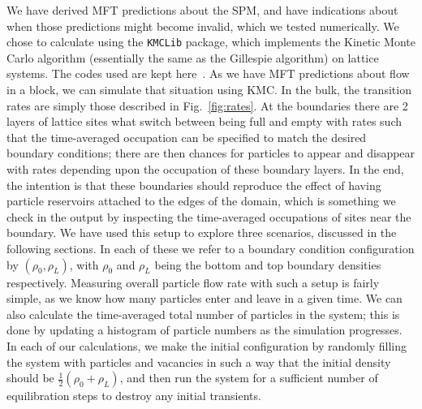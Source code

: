 \documentclass[
reprint,
 amsmath,amssymb,
 aps,
 prl,
]{revtex4-1}
\begin{document}
We have derived MFT predictions about the SPM, and have indications about when those predictions might become invalid, which we tested numerically.
We chose to calculate using the \texttt{KMCLib}\cite{leetmaa2014kmclib} package, which implements the Kinetic Monte Carlo algorithm
(essentially the same as the Gillespie algorithm\cite{Gillespie1977})
on lattice systems. The codes used are kept here~\cite{jHellGitRepo}.
As we have MFT predictions about flow in a block, we can simulate that situation using KMC. In the bulk, the transition rates are simply those described in Fig.~\ref{fig:rates}. At the boundaries
there are 2 layers of lattice sites what switch between being full and empty with rates such that the time-averaged occupation can be specified to match the desired boundary conditions; there are then chances for particles to appear
and disappear with rates depending upon the occupation of these boundary layers. In the end, the intention is that these boundaries should reproduce the effect of having particle reservoirs attached to the edges of the domain,
which is something we check
in the output by inspecting the time-averaged occupations of sites near the boundary. We have used this setup to explore three scenarios, discussed in the following sections. In each of these we refer to a boundary condition configuration
by $(\rho_0, \rho_L)$, with $\rho_0$ and $\rho_L$ being the bottom and top boundary densities respectively.
Measuring overall particle flow rate with such a setup is fairly simple, as we know how many particles enter and leave in a given time.
We can also calculate the time-averaged total number of particles in the system; this is done by updating a histogram of particle numbers
as the simulation progresses. In each of our calculations, we make the initial configuration by randomly filling the system with particles and vacancies in such a way that the initial density should be $\frac{1}{2}(\rho_0 + \rho_L)$, and then
run the system for a sufficient number of equilibration steps to destroy any initial transients.
\end{document}
